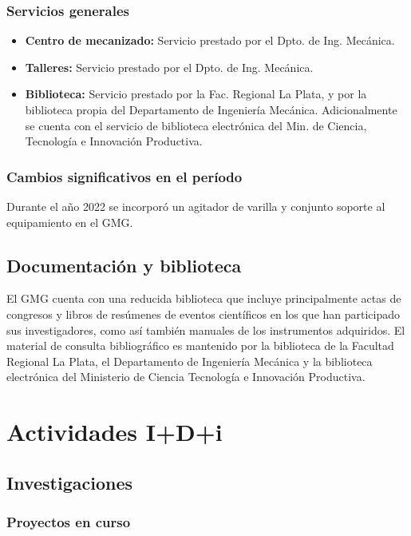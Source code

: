 \documentclass[a4paper,11pt,twoside,final,titlepage,onecolumn,openright]{report}
\begin{document}
\subsection{Servicios generales}

\begin{itemize}
 \item {\bf Centro de mecanizado:} Servicio prestado por el Dpto. de Ing. Mecánica.
 \item {\bf Talleres:} Servicio prestado por el Dpto. de Ing. Mecánica.
 \item {\bf Biblioteca:} Servicio prestado por la Fac. Regional La Plata, y por la biblioteca propia del Departamento de Ingeniería Mecánica. Adicionalmente se cuenta con el servicio de biblioteca electrónica del Min. de Ciencia, Tecnología e Innovación Productiva. 
\end{itemize}

\subsection{Cambios significativos en el período}
Durante el año 2022 se incorporó un agitador de varilla y conjunto soporte al equipamiento en el GMG.

\section{Documentación y biblioteca}

El GMG cuenta con una reducida biblioteca que incluye principalmente actas de congresos y libros de resúmenes de eventos científicos en los que han participado sus investigadores, como así también manuales de los instrumentos adquiridos. El material de consulta bibliográfico es mantenido por la biblioteca de la Facultad Regional La Plata, el Departamento de Ingeniería Mecánica y la biblioteca electrónica del Ministerio de Ciencia Tecnología e Innovación Productiva. 

\chapter{Actividades I+D+i}

\section{Investigaciones}

\subsection{Proyectos en curso}
\end{document}
